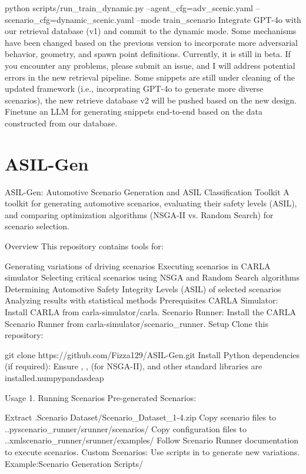\begin{appendix}
python scripts/run\_train\_dynamic.py --agent\_cfg=adv\_scenic.yaml --scenario\_cfg=dynamic\_scenic.yaml --mode train\_scenario
Integrate GPT-4o with our retrieval database (v1) and commit to the dynamic mode. Some mechanisms have been changed based on the previous version to incorporate more adversarial behavior, geometry, and spawn point definitions. Currently, it is still in beta. If you encounter any problems, please submit an issue, and I will address potential errors in the new retrieval pipeline.
Some snippets are still under cleaning of the updated framework (i.e., incorprating GPT-4o to generate more diverse scenarios), the new retrieve database v2 will be pushed based on the new design.
Finetune an LLM for generating snippets end-to-end based on the data constructed from our database.

\section{ASIL-Gen}

ASIL-Gen: Automotive Scenario Generation and ASIL Classification Toolkit
A toolkit for generating automotive scenarios, evaluating their safety levels (ASIL), and comparing optimization algorithms (NSGA-II vs. Random Search) for scenario selection.

Overview
This repository contains tools for:

Generating variations of driving scenarios
Executing scenarios in CARLA simulator
Selecting critical scenarios using NSGA and Random Search algorithms
Determining Automotive Safety Integrity Levels (ASIL) of selected scenarios
Analyzing results with statistical methods
Prerequisites
CARLA Simulator:
Install CARLA from carla-simulator/carla.
Scenario Runner:
Install the CARLA Scenario Runner from carla-simulator/scenario\_runner.
Setup
Clone this repository:

git clone https://github.com/Fizza129/ASIL-Gen.git
Install Python dependencies (if required):
Ensure , , (for NSGA-II), and other standard libraries are installed.numpypandasdeap

Usage
1. Running Scenarios
Pre-generated Scenarios:

Extract .Scenario Dataset/Scenario\_Dataset\_1-4.zip
Copy scenario files to ..pyscenario\_runner/srunner/scenarios/
Copy configuration files to ..xmlscenario\_runner/srunner/examples/
Follow Scenario Runner documentation to execute scenarios.
Custom Scenarios:
Use scripts in to generate new variations. Example:Scenario Generation Scripts/


\end{appendix}
